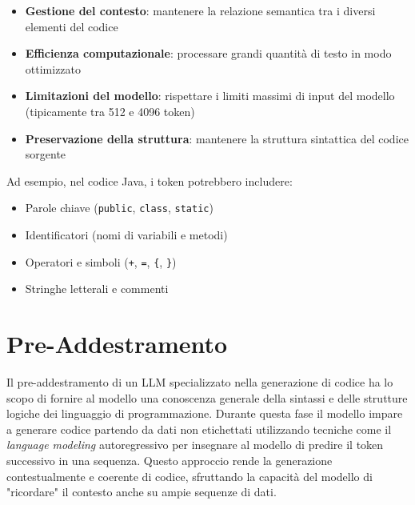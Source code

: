 \documentclass[12pt,a4paper,openright,twoside]{book}
\begin{document}
\begin{itemize}
    \item \textbf{Gestione del contesto}: mantenere la relazione semantica tra i diversi elementi del codice
    \item \textbf{Efficienza computazionale}: processare grandi quantità di testo in modo ottimizzato
    \item \textbf{Limitazioni del modello}: rispettare i limiti massimi di input del modello (tipicamente tra 512 e 4096 token)
    \item \textbf{Preservazione della struttura}: mantenere la struttura sintattica del codice sorgente
\end{itemize}

Ad esempio, nel codice Java, i token potrebbero includere:
\begin{itemize}
    \item Parole chiave (\texttt{public}, \texttt{class}, \texttt{static})
    \item Identificatori (nomi di variabili e metodi)
    \item Operatori e simboli (\texttt{+}, \texttt{=}, \texttt{\{}, \texttt{\}})
    \item Stringhe letterali e commenti
\end{itemize}

\section{Pre-Addestramento}
Il pre-addestramento di un LLM specializzato nella generazione di codice ha lo scopo di fornire al modello una conoscenza generale della sintassi e delle strutture logiche dei linguaggio di programmazione.
Durante questa fase il modello impare a generare codice partendo da dati non etichettati utilizzando tecniche come il \emph{language modeling} autoregressivo per insegnare al modello di predire il token successivo in una sequenza.
Questo approccio rende la generazione contestualmente e coerente di codice, sfruttando la capacità del modello di "ricordare" il contesto anche su ampie sequenze di dati.
\end{document}
